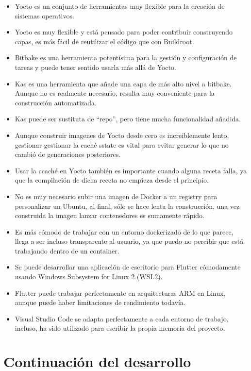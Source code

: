 \begin{itemize}
    \item Yocto es un conjunto de herramientas muy flexible para la creación de sistemas
    operativos.
    \item Yocto es muy flexible y está pensado para poder contribuir construyendo capas,
    es más fácil de reutilizar el código que con Buildroot.
    \item Bitbake es una herramienta potentísima para la gestión y configuración de tareas
    y puede tener sentido usarla más allá de Yocto.
    \item Kas es una herramienta que añade una capa de más alto nivel a bitbake. Aunque
    no es realmente necesario, resulta muy conveniente para la construcción automatizada.
    \item Kas puede ser sustituta de ``repo'', pero tiene mucha funcionalidad añadida.
    \item Aunque construir imagenes de Yocto desde cero es increiblemente lento, gestionar
    gestionar la caché sstate es vital para evitar generar lo que no cambió de generaciones
    posteriores.
    \item Usar la ccaché en Yocto también es importante cuando alguna receta falla, ya
    que la compilación de dicha receta no empieza desde el principio.
    \item No es muy necesario subir una imagen de Docker a un registry para personalizar
    un Ubuntu, al final, sólo se hace lenta la construcción, una vez construida la imagen
    lanzar contenedores es sumamente rápido.
    \item Es más cómodo de trabajar con un entorno dockerizado de lo que parece, llega
    a ser incluso transparente al usuario, ya que puedo no percibir que está trabajando
    dentro de un container.
    \item Se puede desarrollar una aplicación de escritorio para Flutter cómodamente
    usando Windows Subsystem for Linux 2 (WSL2).
    \item Flutter puede trabajar perfectamente en arquitecturas ARM en Linux, aunque
    puede haber limitaciones de rendimiento todavía.
    \item Visual Studio Code se adapta perfectamente a cada entorno de trabajo, incluso,
    ha sido utilizado para escribir la propia memoria del proyecto.

\end{itemize}

\section{Continuación del desarrollo}

